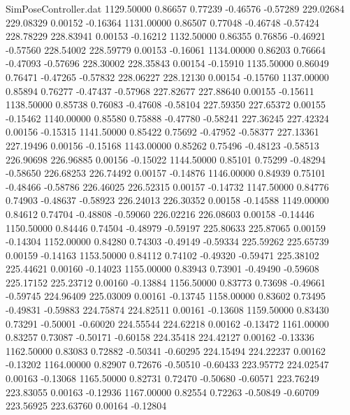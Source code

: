 \begin{filecontents}{SimPoseController.dat}
1129.50000    0.86657    0.77239    -0.46576   -0.57289  229.02684  229.08329    0.00152   -0.16364
1131.00000    0.86507    0.77048    -0.46748   -0.57424  228.78229  228.83941    0.00153   -0.16212
1132.50000    0.86355    0.76856    -0.46921   -0.57560  228.54002  228.59779    0.00153   -0.16061
1134.00000    0.86203    0.76664    -0.47093   -0.57696  228.30002  228.35843    0.00154   -0.15910
1135.50000    0.86049    0.76471    -0.47265   -0.57832  228.06227  228.12130    0.00154   -0.15760
1137.00000    0.85894    0.76277    -0.47437   -0.57968  227.82677  227.88640    0.00155   -0.15611
1138.50000    0.85738    0.76083    -0.47608   -0.58104  227.59350  227.65372    0.00155   -0.15462
1140.00000    0.85580    0.75888    -0.47780   -0.58241  227.36245  227.42324    0.00156   -0.15315
1141.50000    0.85422    0.75692    -0.47952   -0.58377  227.13361  227.19496    0.00156   -0.15168
1143.00000    0.85262    0.75496    -0.48123   -0.58513  226.90698  226.96885    0.00156   -0.15022
1144.50000    0.85101    0.75299    -0.48294   -0.58650  226.68253  226.74492    0.00157   -0.14876
1146.00000    0.84939    0.75101    -0.48466   -0.58786  226.46025  226.52315    0.00157   -0.14732
1147.50000    0.84776    0.74903    -0.48637   -0.58923  226.24013  226.30352    0.00158   -0.14588
1149.00000    0.84612    0.74704    -0.48808   -0.59060  226.02216  226.08603    0.00158   -0.14446
1150.50000    0.84446    0.74504    -0.48979   -0.59197  225.80633  225.87065    0.00159   -0.14304
1152.00000    0.84280    0.74303    -0.49149   -0.59334  225.59262  225.65739    0.00159   -0.14163
1153.50000    0.84112    0.74102    -0.49320   -0.59471  225.38102  225.44621    0.00160   -0.14023
1155.00000    0.83943    0.73901    -0.49490   -0.59608  225.17152  225.23712    0.00160   -0.13884
1156.50000    0.83773    0.73698    -0.49661   -0.59745  224.96409  225.03009    0.00161   -0.13745
1158.00000    0.83602    0.73495    -0.49831   -0.59883  224.75874  224.82511    0.00161   -0.13608
1159.50000    0.83430    0.73291    -0.50001   -0.60020  224.55544  224.62218    0.00162   -0.13472
1161.00000    0.83257    0.73087    -0.50171   -0.60158  224.35418  224.42127    0.00162   -0.13336
1162.50000    0.83083    0.72882    -0.50341   -0.60295  224.15494  224.22237    0.00162   -0.13202
1164.00000    0.82907    0.72676    -0.50510   -0.60433  223.95772  224.02547    0.00163   -0.13068
1165.50000    0.82731    0.72470    -0.50680   -0.60571  223.76249  223.83055    0.00163   -0.12936
1167.00000    0.82554    0.72263    -0.50849   -0.60709  223.56925  223.63760    0.00164   -0.12804

\end{filecontents}
